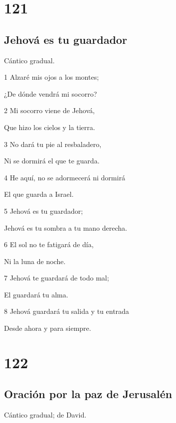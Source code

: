 \chapter{121}

\section*{Jehová es tu guardador}

\par Cántico gradual.

\par 1 Alzaré mis ojos a los montes;
\par ¿De dónde vendrá mi socorro?
\par 2 Mi socorro viene de Jehová,
\par Que hizo los cielos y la tierra.
\par 3 No dará tu pie al resbaladero,
\par Ni se dormirá el que te guarda.
\par 4 He aquí, no se adormecerá ni dormirá
\par El que guarda a Israel.
\par 5 Jehová es tu guardador;
\par Jehová es tu sombra a tu mano derecha.
\par 6 El sol no te fatigará de día,
\par Ni la luna de noche.
\par 7 Jehová te guardará de todo mal;
\par El guardará tu alma.
\par 8 Jehová guardará tu salida y tu entrada
\par Desde ahora y para siempre.

\chapter{122}

\section*{Oración por la paz de Jerusalén}

\par Cántico gradual; de David.

